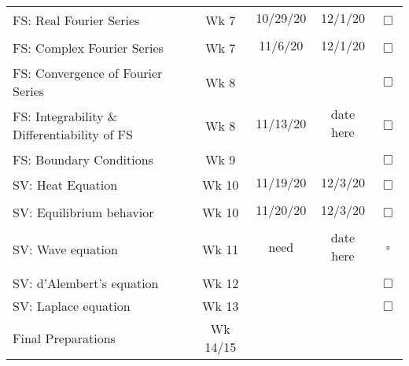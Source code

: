 \documentclass{article}
\newcommand{\checked}{\makebox[0pt][l]{$\checkmark$}$\square$}
\newcommand{\unchecked}{$\Box$}
\begin{document}
\begin{tabular}{|l|c|c|c|c}
\multirow{2}{5cm}{FS: Real Fourier Series} & \multirow{2}{1.5cm}{Wk 7}  & 10/29/20 & 12/1/20 &  \multirow{2}{.4cm}{\unchecked} \\ &&&& \\ \cline{1-4}
\multirow{2}{5cm}{FS: Complex Fourier Series} & \multirow{2}{1.5cm}{Wk 7} & 11/6/20 & 12/1/20 & \multirow{2}{.4cm}{\unchecked} \\ &&&& \\ \cline{1-4}
\multirow{2}{7cm}{FS: Convergence of Fourier Series} & \multirow{2}{1.5cm}{Wk 8} &&& \multirow{2}{.4cm}{\unchecked} \\ &&&& \\  \cline{1-4}
\multirow{2}{7cm}{FS: Integrability \& Differentiability of FS} & \multirow{2}{1.5cm}{Wk 8} & 11/13/20 & date here & \multirow{2}{.4cm}{\unchecked} \\ &&&& \\  \cline{1-4}
\multirow{2}{5cm}{FS: Boundary Conditions} & \multirow{2}{1.5cm}{Wk 9} &&& \multirow{2}{.4cm}{\unchecked} \\ &&&& \\ \cline{1-4}
\multirow{2}{5cm}{SV: Heat Equation} & \multirow{2}{1.5cm}{Wk 10} & 11/19/20 & 12/3/20 & \multirow{2}{.4cm}{\unchecked} \\ &&&& \\ \cline{1-4}
\multirow{2}{5cm}{SV: Equilibrium behavior} & \multirow{2}{1.5cm}{Wk 10} & 11/20/20 & 12/3/20 & \multirow{2}{.4cm}{\unchecked} \\ &&&& \\ \cline{1-4}
\multirow{2}{5cm}{SV: Wave equation} & \multirow{2}{1.5cm}{Wk 11} & need & date here & \multirow{2}{.4cm}{\checked} \\ &&&& \\ \cline{1-4}
\multirow{2}{5cm}{SV: d'Alembert's equation} & \multirow{2}{1.5cm}{Wk 12} &&& \multirow{2}{.4cm}{\unchecked} \\ &&&& \\ \cline{1-4}
\multirow{2}{5cm}{SV: Laplace equation} & \multirow{2}{1.5cm}{Wk 13} &&& \multirow{2}{.4cm}{\unchecked} \\ &&&& \\ \cline{1-4}
\multirow{2}{5cm}{Final Preparations} & \multirow{2}{1.8cm}{Wk 14/15} &&&   \\&&&& \\ \cline{1-4}
\end{tabular}
\newpage
\end{document}
